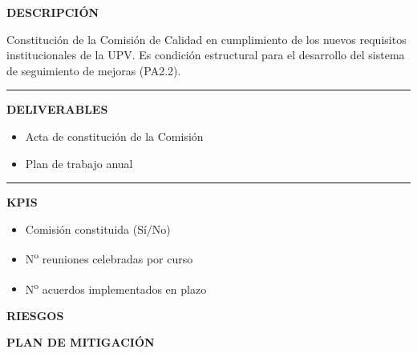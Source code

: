 \documentclass[11pt,a4paper]{scrreprt}
\newcommand{\fieldlabel}[1]{%
  {\footnotesize\sffamily\bfseries\color{mutedcolor}\MakeUppercase{#1}}\par\nopagebreak[4]
}
\newcommand{\fieldsep}{\vspace{3pt}\noindent\textcolor{bordercolor}{\rule{\linewidth}{0.4pt}}\vspace{3pt}\par}
\begin{document}
\begin{tcolorbox}[pabox={gobcolor}{PA1.1 \enspace\textbullet\enspace Constitución de la Comisión de Calidad}]

\fieldlabel{Descripci\'on}
{\small Constitución de la Comisión de Calidad en cumplimiento de los nuevos requisitos institucionales de la UPV. Es condición estructural para el desarrollo del sistema de seguimiento de mejoras (PA2.2).}\par
\fieldsep
\fieldlabel{Deliverables}
{\small \begin{itemize}[noitemsep,topsep=2pt]
\item Acta de constitución de la Comisión
\item Plan de trabajo anual
\end{itemize}}\par
\fieldsep
\fieldlabel{KPIs}
{\small \begin{itemize}[noitemsep,topsep=2pt]
\item Comisión constituida (Sí/No)
\item N\textsuperscript{o} reuniones celebradas por curso
\item N\textsuperscript{o} acuerdos implementados en plazo
\end{itemize}}\par
\end{tcolorbox}
\begin{tcolorbox}[riskbox]
{\footnotesize\sffamily\bfseries\color{red!50!black} RIESGOS}\par{}
\end{tcolorbox}
\begin{tcolorbox}[mitbox]
{\footnotesize\sffamily\bfseries\color{green!40!black} PLAN DE MITIGACI\'ON}\par{}
\end{tcolorbox}
\vspace{8pt}
\end{document}
